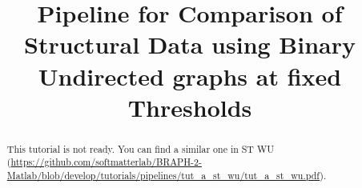 \documentclass[justified]{tufte-handout}
\title{Pipeline for Comparison of Structural Data using Binary Undirected graphs at fixed Thresholds}
\begin{document}
\maketitle

\begin{abstract}
\noindent
This tutorial is not ready. You can find a similar one in ST WU (\url{https://github.com/softmatterlab/BRAPH-2-Matlab/blob/develop/tutorials/pipelines/tut_a_st_wu/tut_a_st_wu.pdf}).
\end{abstract}
\end{document}
